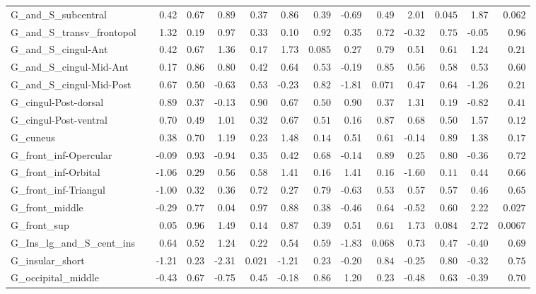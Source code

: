 {\begin{longtable}{llrrrrrrrrrrrr}
G\_and\_S\_subcentral &  & 0.42 & $0.67$ & 0.89 & $0.37$ & 0.86 & $0.39$ & -0.69 & $0.49$ & 2.01 & $0.045$ & 1.87 & $0.062$ \\
G\_and\_S\_transv\_frontopol &  & 1.32 & $0.19$ & 0.97 & $0.33$ & 0.10 & $0.92$ & 0.35 & $0.72$ & -0.32 & $0.75$ & -0.05 & $0.96$ \\
G\_and\_S\_cingul-Ant &  & 0.42 & $0.67$ & 1.36 & $0.17$ & 1.73 & $0.085$ & 0.27 & $0.79$ & 0.51 & $0.61$ & 1.24 & $0.21$ \\
G\_and\_S\_cingul-Mid-Ant &  & 0.17 & $0.86$ & 0.80 & $0.42$ & 0.64 & $0.53$ & -0.19 & $0.85$ & 0.56 & $0.58$ & 0.53 & $0.60$ \\
G\_and\_S\_cingul-Mid-Post &  & 0.67 & $0.50$ & -0.63 & $0.53$ & -0.23 & $0.82$ & -1.81 & $0.071$ & 0.47 & $0.64$ & -1.26 & $0.21$ \\
G\_cingul-Post-dorsal &  & 0.89 & $0.37$ & -0.13 & $0.90$ & 0.67 & $0.50$ & 0.90 & $0.37$ & 1.31 & $0.19$ & -0.82 & $0.41$ \\
G\_cingul-Post-ventral &  & 0.70 & $0.49$ & 1.01 & $0.32$ & 0.67 & $0.51$ & 0.16 & $0.87$ & 0.68 & $0.50$ & 1.57 & $0.12$ \\
G\_cuneus &  & 0.38 & $0.70$ & 1.19 & $0.23$ & 1.48 & $0.14$ & 0.51 & $0.61$ & -0.14 & $0.89$ & 1.38 & $0.17$ \\
G\_front\_inf-Opercular &  & -0.09 & $0.93$ & -0.94 & $0.35$ & 0.42 & $0.68$ & -0.14 & $0.89$ & 0.25 & $0.80$ & -0.36 & $0.72$ \\
G\_front\_inf-Orbital &  & -1.06 & $0.29$ & 0.56 & $0.58$ & 1.41 & $0.16$ & 1.41 & $0.16$ & -1.60 & $0.11$ & 0.44 & $0.66$ \\
G\_front\_inf-Triangul &  & -1.00 & $0.32$ & 0.36 & $0.72$ & 0.27 & $0.79$ & -0.63 & $0.53$ & 0.57 & $0.57$ & 0.46 & $0.65$ \\
G\_front\_middle &  & -0.29 & $0.77$ & 0.04 & $0.97$ & 0.88 & $0.38$ & -0.46 & $0.64$ & -0.52 & $0.60$ & 2.22 & $0.027$ \\
G\_front\_sup &  & 0.05 & $0.96$ & 1.49 & $0.14$ & 0.87 & $0.39$ & 0.51 & $0.61$ & 1.73 & $0.084$ & 2.72 & $0.0067$ \\
G\_Ins\_lg\_and\_S\_cent\_ins &  & 0.64 & $0.52$ & 1.24 & $0.22$ & 0.54 & $0.59$ & -1.83 & $0.068$ & 0.73 & $0.47$ & -0.40 & $0.69$ \\
G\_insular\_short &  & -1.21 & $0.23$ & -2.31 & $0.021$ & -1.21 & $0.23$ & -0.20 & $0.84$ & -0.25 & $0.80$ & -0.32 & $0.75$ \\
G\_occipital\_middle &  & -0.43 & $0.67$ & -0.75 & $0.45$ & -0.18 & $0.86$ & 1.20 & $0.23$ & -0.48 & $0.63$ & -0.39 & $0.70$ \\

\end{longtable}}
